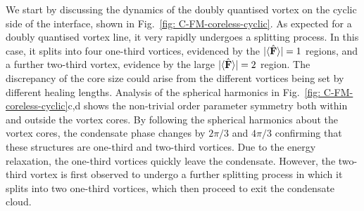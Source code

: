 We start by discussing the dynamics of the doubly quantised vortex on the cyclic
side of the interface, shown in Fig.~\ref{fig: C-FM-coreless-cyclic}.
As expected for a doubly quantised vortex line, it very rapidly undergoes a
splitting process.
In this case, it splits into four one-third vortices, evidenced by the
\(|\langle \hat{\vb{F}} \rangle | = 1\) regions, and a further two-third vortex, evidence by the large
\(|\langle \hat{\vb{F}} \rangle | = 2\) region.
The discrepancy of the core size could arise from the different vortices being
set by different healing lengths.
Analysis of the spherical harmonics in Fig.~\ref{fig: C-FM-coreless-cyclic}c,d
shows the non-trivial order parameter symmetry both within and outside the
vortex cores.
By following the spherical harmonics about the vortex cores, the condensate
phase changes by \(2\pi/3\) and \(4\pi/3\) confirming that these structures are
one-third and two-third vortices.
Due to the energy relaxation, the one-third vortices quickly leave the
condensate.
However, the two-third vortex is first observed to undergo a further splitting
process in which it splits into two one-third vortices, which then proceed to
exit the condensate cloud.


